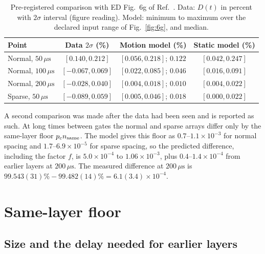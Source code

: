 \documentclass[aps,pra,twocolumn,superscriptaddress,longbibliography,floatfix]{revtex4-2}
\newcommand{\us}{\,\mu\mathrm{s}}
\begin{document}
\begin{table}[!tp]
\caption{Pre-registered comparison with ED Fig.~6g of Ref.~\cite{Bluvstein2026}. Data: $D(t)$ in percent with $2\sigma$ interval (figure reading). Model: minimum to maximum over the declared input range of Fig.~\ref{fig:6g}, and median.}
\label{tab:6g}
\begin{ruledtabular}
\begin{tabular}{lccc}
Point & Data $2\sigma$ (\%) & Motion model (\%) & Static model (\%)\\ \hline
Normal, $50\us$ & $[0.140,0.212]$ & $[0.056,0.218]$; $0.122$ & $[0.042,0.247]$\\
Normal, $100\us$ & $[-0.067,0.069]$ & $[0.022,0.085]$; $0.046$ & $[0.016,0.091]$\\
Normal, $200\us$ & $[-0.028,0.040]$ & $[0.004,0.018]$; $0.010$ & $[0.004,0.022]$\\
Sparse, $50\us$ & $[-0.089,0.059]$ & $[0.005,0.046]$; $0.018$ & $[0.000,0.022]$\\
\end{tabular}
\end{ruledtabular}
\end{table}

A second comparison was made after the data had been seen and is reported as such. At long times between gates the normal and sparse arrays differ only by the same-layer floor $p_cn_{\rm same}$. The model gives this floor as $0.7$--$1.1\times10^{-3}$ for normal spacing and $1.7$--$6.9\times10^{-5}$ for sparse spacing, so the predicted difference, including the factor $f$, is $5.0\times10^{-4}$ to $1.06\times10^{-3}$, plus $0.4$--$1.4\times10^{-4}$ from earlier layers at $200\us$. The measured difference at $200\us$ is $99.543(31)\%-99.482(14)\%=6.1(3.4)\times10^{-4}$.

\section{Same-layer floor}
\label{sec:floor}

\subsection{Size and the delay needed for earlier layers}
\end{document}
